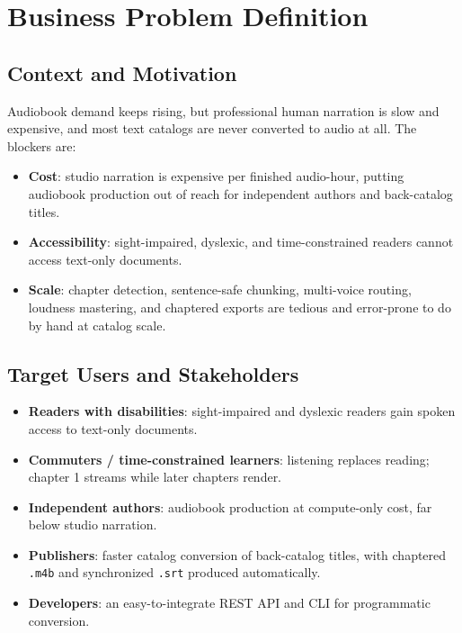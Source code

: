 \documentclass[12pt,a4paper]{article}
\begin{document}
\section{Business Problem Definition}

\subsection{Context and Motivation}

Audiobook demand keeps rising, but professional human narration is slow and expensive, and most text catalogs are never converted to audio at all. The blockers are:
\begin{itemize}
  \item \textbf{Cost}: studio narration is expensive per finished audio-hour, putting audiobook production out of reach for independent authors and back-catalog titles.
  \item \textbf{Accessibility}: sight-impaired, dyslexic, and time-constrained readers cannot access text-only documents.
  \item \textbf{Scale}: chapter detection, sentence-safe chunking, multi-voice routing, loudness mastering, and chaptered exports are tedious and error-prone to do by hand at catalog scale.
\end{itemize}

\subsection{Target Users and Stakeholders}

\begin{itemize}
  \item \textbf{Readers with disabilities}: sight-impaired and dyslexic readers gain spoken access to text-only documents.
  \item \textbf{Commuters / time-constrained learners}: listening replaces reading; chapter 1 streams while later chapters render.
  \item \textbf{Independent authors}: audiobook production at compute-only cost, far below studio narration.
  \item \textbf{Publishers}: faster catalog conversion of back-catalog titles, with chaptered \texttt{.m4b} and synchronized \texttt{.srt} produced automatically.
  \item \textbf{Developers}: an easy-to-integrate REST API and CLI for programmatic conversion.
\end{itemize}
\end{document}
